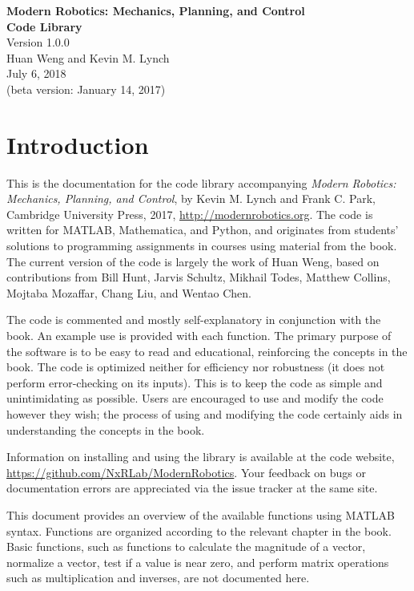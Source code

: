 \documentclass[11pt]{article}
\begin{document}
\begin{center}			%
\Large
{\bf Modern Robotics:  Mechanics, Planning, and Control} \\
{\bf Code Library} \\
\normalsize
Version 1.0.0\\
\vspace*{0.2in}
Huan Weng and Kevin M. Lynch \\
July 6, 2018 \\
(beta version:  January 14, 2017)
\end{center}

\section*{Introduction}			

This is the documentation for the code library accompanying \emph{Modern Robotics:  Mechanics, Planning, and Control}, by Kevin M. Lynch and Frank C. Park, Cambridge University Press, 2017, \url{http://modernrobotics.org}.  The code is written for MATLAB, Mathematica, and Python, and originates from students' solutions to programming assignments in courses using material from the book.  The current version of the code is largely the work of Huan Weng, based on contributions from Bill Hunt, Jarvis Schultz, Mikhail Todes, Matthew Collins, Mojtaba Mozaffar, Chang Liu, and Wentao Chen.  

The code is commented and mostly self-explanatory in conjunction with the book.  An example use is provided with each function.  The primary purpose of the software is to be easy to read and educational, reinforcing the concepts in the book.  The code is optimized neither for efficiency nor robustness (it does not perform error-checking on its inputs).  This is to keep the code as simple and unintimidating as possible.  Users are encouraged to use and modify the code however they wish; the process of using and modifying the code certainly aids in understanding the concepts in the book.

Information on installing and using the library is available at the code website, \url{https://github.com/NxRLab/ModernRobotics}.  Your feedback on bugs or documentation errors are appreciated via the issue tracker at the same site.

This document provides an overview of the available functions using MATLAB syntax.  Functions are organized according to the relevant chapter in the book.  Basic functions, such as functions to calculate the magnitude of a vector, normalize a vector, test if a value is near zero, and perform matrix operations such as multiplication and inverses, are not documented here.
\end{document}

